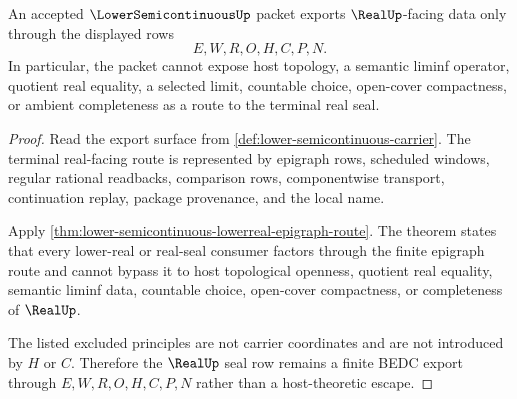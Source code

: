 \begin{theorem}
\label{thm:lower-semicontinuous-real-seal-window-nonescape}
An accepted $\LowerSemicontinuousUp$ packet exports $\RealUp$-facing data only
through the displayed rows
$$
E,W,R,O,H,C,P,N .
$$
In particular, the packet cannot expose host topology, a semantic liminf
operator, quotient real equality, a selected limit, countable choice,
open-cover compactness, or ambient completeness as a route to the terminal
real seal.
\end{theorem}
\begin{proof}
Read the export surface from \autoref{def:lower-semicontinuous-carrier}. The
terminal real-facing route is represented by epigraph rows, scheduled windows,
regular rational readbacks, comparison rows, componentwise transport,
continuation replay, package provenance, and the local name.

Apply \autoref{thm:lower-semicontinuous-lowerreal-epigraph-route}. The theorem
states that every lower-real or real-seal consumer factors through the finite
epigraph route and cannot bypass it to host topological openness, quotient
real equality, semantic liminf data, countable choice, open-cover compactness,
or completeness of $\RealUp$.

The listed excluded principles are not carrier coordinates and are not
introduced by $H$ or $C$. Therefore the $\RealUp$ seal row remains a finite
BEDC export through $E,W,R,O,H,C,P,N$ rather than a host-theoretic escape.
\end{proof}

